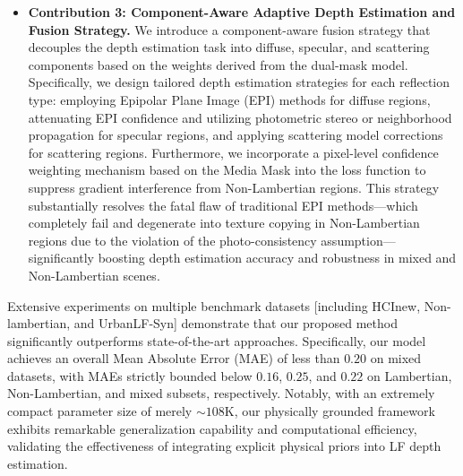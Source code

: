 \begin{itemize}\item \textbf{Contribution 3: Component-Aware Adaptive Depth Estimation and Fusion Strategy.} We introduce a component-aware fusion strategy that decouples the depth estimation task into diffuse, specular, and scattering components based on the weights derived from the dual-mask model. Specifically, we design tailored depth estimation strategies for each reflection type: employing Epipolar Plane Image (EPI) methods for diffuse regions, attenuating EPI confidence and utilizing photometric stereo or neighborhood propagation for specular regions, and applying scattering model corrections for scattering regions. Furthermore, we incorporate a pixel-level confidence weighting mechanism based on the Media Mask into the loss function to suppress gradient interference from Non-Lambertian regions. This strategy substantially resolves the fatal flaw of traditional EPI methods—which completely fail and degenerate into texture copying in Non-Lambertian regions due to the violation of the photo-consistency assumption—significantly boosting depth estimation accuracy and robustness in mixed and Non-Lambertian scenes.\end{itemize}

Extensive experiments on multiple benchmark datasets  [including HCInew, Non-lambertian, and UrbanLF-Syn] demonstrate that our proposed method significantly outperforms state-of-the-art approaches. Specifically, our model achieves an overall Mean Absolute Error (MAE) of less than $0.20$ on mixed datasets, with MAEs strictly bounded below $0.16$, $0.25$, and $0.22$ on Lambertian, Non-Lambertian, and mixed subsets, respectively. Notably, with an extremely compact parameter size of merely $\sim 108$K, our physically grounded framework exhibits remarkable generalization capability and computational efficiency, validating the effectiveness of integrating explicit physical priors into LF depth estimation.
